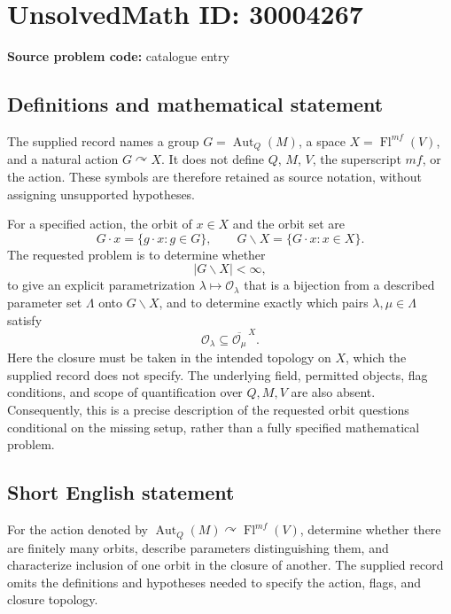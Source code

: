 \documentclass[11pt]{article}
\begin{document}
\section*{UnsolvedMath ID: 30004267}
\textbf{Source problem code:} catalogue entry
\subsection{Definitions and mathematical statement}
The supplied record names a group \(G=\operatorname{Aut}_{Q}(M)\), a space \(X=\operatorname{Fl}^{mf}(V)\), and a natural action \(G\curvearrowright X\). It does not define \(Q\), \(M\), \(V\), the superscript \(mf\), or the action. These symbols are therefore retained as source notation, without assigning unsupported hypotheses.

For a specified action, the orbit of \(x\in X\) and the orbit set are
\[
G\cdot x=\{g\cdot x:g\in G\},\qquad G\backslash X=\{G\cdot x:x\in X\}.
\]
The requested problem is to determine whether
\[
\lvert G\backslash X\rvert<\infty,
\]
to give an explicit parametrization \(\lambda\mapsto\mathcal O_\lambda\) that is a bijection from a described parameter set \(\Lambda\) onto \(G\backslash X\), and to determine exactly which pairs \(\lambda,\mu\in\Lambda\) satisfy
\[
\mathcal O_\lambda\subseteq\overline{\mathcal O_\mu}^{\,X}.
\]
Here the closure must be taken in the intended topology on \(X\), which the supplied record does not specify. The underlying field, permitted objects, flag conditions, and scope of quantification over \(Q,M,V\) are also absent. Consequently, this is a precise description of the requested orbit questions conditional on the missing setup, rather than a fully specified mathematical problem.
\subsection{Short English statement}
For the action denoted by \(\operatorname{Aut}_{Q}(M)\curvearrowright\operatorname{Fl}^{mf}(V)\), determine whether there are finitely many orbits, describe parameters distinguishing them, and characterize inclusion of one orbit in the closure of another. The supplied record omits the definitions and hypotheses needed to specify the action, flags, and closure topology.
\end{document}
